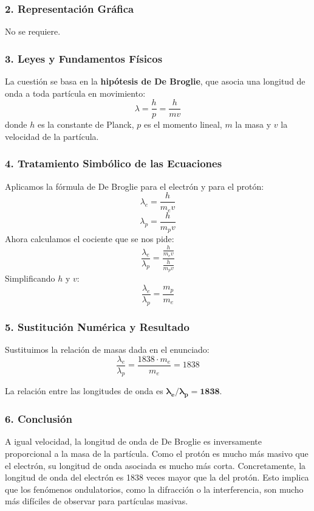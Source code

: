 \subsubsection*{2. Representación Gráfica}
No se requiere.

\subsubsection*{3. Leyes y Fundamentos Físicos}
La cuestión se basa en la \textbf{hipótesis de De Broglie}, que asocia una longitud de onda a toda partícula en movimiento:
$$\lambda = \frac{h}{p} = \frac{h}{mv}$$
donde $h$ es la constante de Planck, $p$ es el momento lineal, $m$ la masa y $v$ la velocidad de la partícula.

\subsubsection*{4. Tratamiento Simbólico de las Ecuaciones}
Aplicamos la fórmula de De Broglie para el electrón y para el protón:
$$\lambda_e = \frac{h}{m_e v}$$
$$\lambda_p = \frac{h}{m_p v}$$
Ahora calculamos el cociente que se nos pide:
$$\frac{\lambda_e}{\lambda_p} = \frac{\frac{h}{m_e v}}{\frac{h}{m_p v}}$$
Simplificando $h$ y $v$:
$$\frac{\lambda_e}{\lambda_p} = \frac{m_p}{m_e}$$

\subsubsection*{5. Sustitución Numérica y Resultado}
Sustituimos la relación de masas dada en el enunciado:
$$\frac{\lambda_e}{\lambda_p} = \frac{1838 \cdot m_e}{m_e} = 1838$$
\begin{cajaresultado}
    La relación entre las longitudes de onda es $\boldsymbol{\lambda_e / \lambda_p = 1838}$.
\end{cajaresultado}

\subsubsection*{6. Conclusión}
\begin{cajaconclusion}
A igual velocidad, la longitud de onda de De Broglie es inversamente proporcional a la masa de la partícula. Como el protón es mucho más masivo que el electrón, su longitud de onda asociada es mucho más corta. Concretamente, la longitud de onda del electrón es 1838 veces mayor que la del protón. Esto implica que los fenómenos ondulatorios, como la difracción o la interferencia, son mucho más difíciles de observar para partículas masivas.
\end{cajaconclusion}

\newpage
